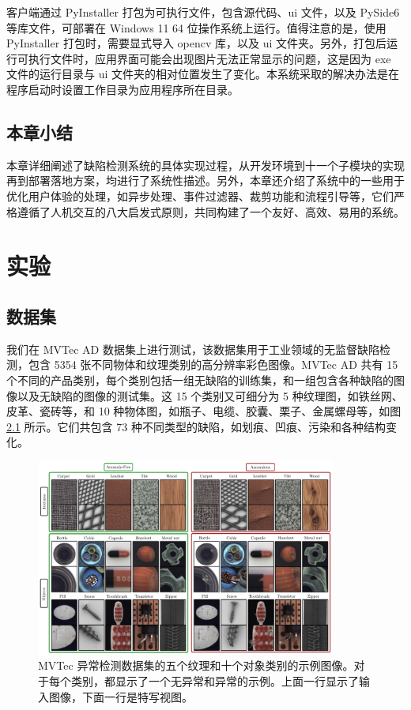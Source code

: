 \documentclass[
  ]{njuthesis}
\begin{document}
客户端通过 PyInstaller 打包为可执行文件，包含源代码、ui 文件，以及 PySide6 等库文件，可部署在 Windows 11 64 位操作系统上运行。值得注意的是，使用 PyInstaller 打包时，需要显式导入 opencv 库，以及 ui 文件夹。另外，打包后运行可执行文件时，应用界面可能会出现图片无法正常显示的问题，这是因为 exe 文件的运行目录与 ui 文件夹的相对位置发生了变化。本系统采取的解决办法是在程序启动时设置工作目录为应用程序所在目录。

\section{本章小结}

本章详细阐述了缺陷检测系统的具体实现过程，从开发环境到十一个子模块的实现再到部署落地方案，均进行了系统性描述。另外，本章还介绍了系统中的一些用于优化用户体验的处理，如异步处理、事件过滤器、裁剪功能和流程引导等，它们严格遵循了人机交互的八大启发式原则，共同构建了一个友好、高效、易用的系统。

\chapter{实验}

\section{数据集}

我们在 MVTec AD 数据集上进行测试，该数据集用于工业领域的无监督缺陷检测，包含 5354 张不同物体和纹理类别的高分辨率彩色图像。MVTec AD 共有 15 个不同的产品类别，每个类别包括一组无缺陷的训练集，和一组包含各种缺陷的图像以及无缺陷的图像的测试集。这 15 个类别又可细分为 5 种纹理图，如铁丝网、皮革、瓷砖等，和 10 种物体图，如瓶子、电缆、胶囊、栗子、金属螺母等，如图 \ref{MVTec} 所示。它们共包含 73 种不同类型的缺陷，如划痕、凹痕、污染和各种结构变化。

\begin{figure}[htb]
    \centering
    \includegraphics[width=0.88\textwidth]{images/MVTec.png}
    \caption{MVTec 异常检测数据集的五个纹理和十个对象类别的示例图像。对于每个类别，都显示了一个无异常和异常的示例。上面一行显示了输入图像，下面一行是特写视图。}
    \label{MVTec}
\end{figure}
\end{document}
